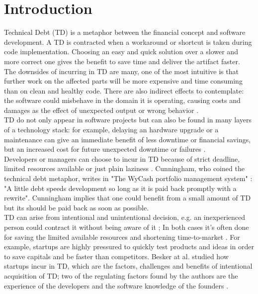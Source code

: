 \chapter{Introduction}
Technical Debt (TD) is a metaphor between the financial concept and software development.
A TD is contracted when a workaround or shortcut is taken during code implementation.
Choosing an easy and quick solution over a slower and more correct one gives the benefit to save time and deliver the artifact faster. 
\\
The downsides of incurring in TD are many, one of the most intuitive is that further work on the affected parts will be more expensive and time consuming than on clean and healthy code. There are also indirect effects to contemplate: the software could misbehave in the domain it is operating, causing costs and damages as the effect of unexpected output or wrong behavior \cite{tom2013exploration}.
\\
TD do not only appear in software projects but can also be found in many layers of a technology stack: for example, delaying an hardware upgrade or a maintenance can give an immediate benefit of less downtime or financial savings, but an increased cost for future unexpected downtime or failures \cite{allman2012managing}.
\\
Developers or managers can choose to incur in TD because of strict deadline, limited resources available or just plain laziness \cite{hinsen2015technical,allman2012managing}. Cunningham, who coined the technical debt metaphor, writes in "The WyCash portfolio management system" \cite{cunningham1992wycash}: "A little debt speeds development so long as it is paid back promptly with a rewrite". Cunningham implies that one could benefit from a small amount of TD but its should be paid back as soon as possible. 
\\
TD can arise from intentional and unintentional decision, e.g. an inexperienced person could contract it without being aware of it \cite{hinsen2015technical}; In both cases it's often done for saving the limited available resources and shortening time-to-market \cite{tom2012consolidated}. For example, startups are highly pressured to quickly test products and ideas in order to save capitals and be faster than competitors.
Besker at al. studied how startups incur in TD, which are the factors, challenges and benefits of intentional acquisition of TD; two of the regulating factors found by the authors are the experience of the developers and the software knowledge of the founders \cite{besker2018embracing}.
